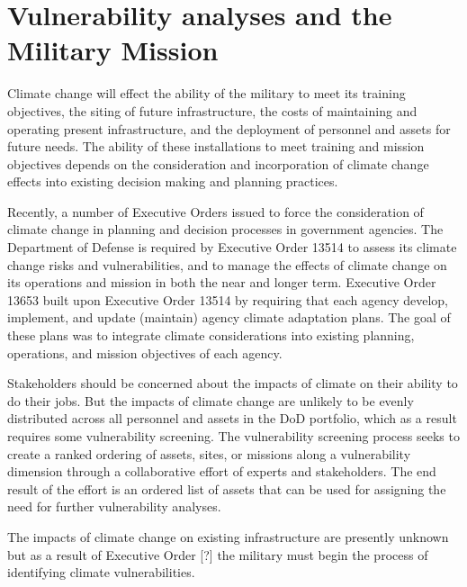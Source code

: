 \documentclass[10pt]{amsart}
\begin{document}
\section{Vulnerability analyses and the Military Mission}
Climate change will effect the ability of the military to meet its training objectives, the siting of future infrastructure, the costs of maintaining and operating present infrastructure, and the deployment of personnel and assets for future needs.
The ability of these installations to meet training and mission objectives depends on the consideration and incorporation of climate change effects into existing decision making and planning practices. 

Recently, a number of Executive Orders issued to force the consideration of climate change in planning and decision processes in government agencies. 
The Department of Defense is required by Executive Order 13514 to assess its climate change risks and vulnerabilities, and to manage the effects of climate change on its operations and mission in both the near and longer term. 
Executive Order 13653 built upon Executive Order 13514 by requiring that each agency develop, implement, and update (maintain) agency climate adaptation plans.
The goal of these plans was to integrate climate considerations into existing planning, operations, and mission objectives of each agency.

Stakeholders should be concerned about the impacts of climate on their ability to do their jobs. 
But the impacts of climate change are unlikely to be evenly distributed across all personnel and assets in the DoD portfolio, which as a result requires some vulnerability screening.
The vulnerability screening process seeks to create a ranked ordering of assets, sites, or missions along a vulnerability dimension through a collaborative effort of experts and stakeholders.
The end result of the effort is an ordered list of assets that can be used for assigning the need for further vulnerability analyses. 

The impacts of climate change on existing infrastructure are presently unknown but as a result of Executive Order [?] the military must begin the process of identifying climate vulnerabilities. 
\end{document}
